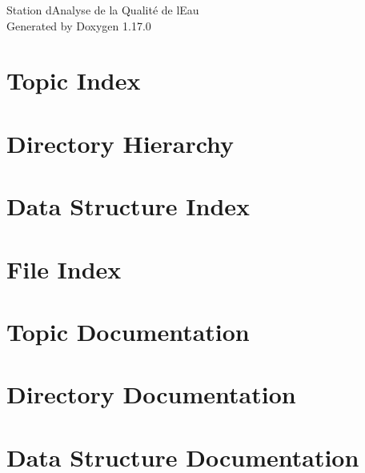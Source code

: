 \documentclass[twoside]{book}
\newcommand{\+}{\discretionary{\mbox{\scriptsize$\hookleftarrow$}}{}{}}
\newcommand{\clearemptydoublepage}{%
    \newpage{\pagestyle{empty}\cleardoublepage}%
  }
\begin{document}
  \raggedbottom
    \hypersetup{pageanchor=false,
                bookmarksnumbered=true,
                pdfencoding=unicode
               }
  \begin{titlepage}
  \vspace*{7cm}
  \begin{center}%
  {\Large Station d\textquotesingle{}\+Analyse de la Qualité de l\textquotesingle{}\+Eau}\\
  \vspace*{1cm}
  {\large Generated by Doxygen 1.17.0}\\
  \end{center}
  \end{titlepage}
  \clearemptydoublepage
  \tableofcontents
  \clearemptydoublepage
  \hypersetup{pageanchor=true}
\chapter{Topic Index}

\chapter{Directory Hierarchy}

\chapter{Data Structure Index}

\chapter{File Index}

\chapter{Topic Documentation}


\chapter{Directory Documentation}




\chapter{Data Structure Documentation}













\end{document}
